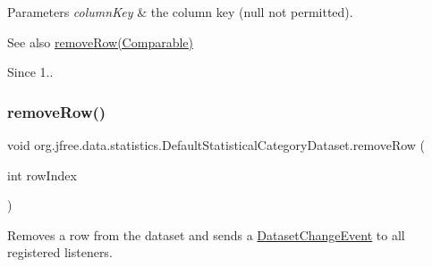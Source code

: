 \begin{DoxyParams}{Parameters}
{\em column\+Key} & the column key ({\ttfamily null} not permitted).\\
\hline
\end{DoxyParams}
\begin{DoxySeeAlso}{See also}
\mbox{\hyperlink{classorg_1_1jfree_1_1data_1_1statistics_1_1_default_statistical_category_dataset_a679a64d7b03d1530ebc792cb8aa01f7e}{remove\+Row(\+Comparable)}}
\end{DoxySeeAlso}
\begin{DoxySince}{Since}
1.. 
\end{DoxySince}
\mbox{\label{classorg_1_1jfree_1_1data_1_1statistics_1_1_default_statistical_category_dataset_ab5739fe0b41281d22ec2f4d294379cbb}} 
\subsubsection{\texorpdfstring{remove\+Row()}{removeRow()}\hspace{0.1cm}{\footnotesize\ttfamily [1/2]}}
{\footnotesize\ttfamily void org.\+jfree.\+data.\+statistics.\+Default\+Statistical\+Category\+Dataset.\+remove\+Row (\begin{DoxyParamCaption}\item[{int}]{row\+Index }\end{DoxyParamCaption})}

Removes a row from the dataset and sends a \mbox{\hyperlink{}{Dataset\+Change\+Event}} to all registered listeners.


